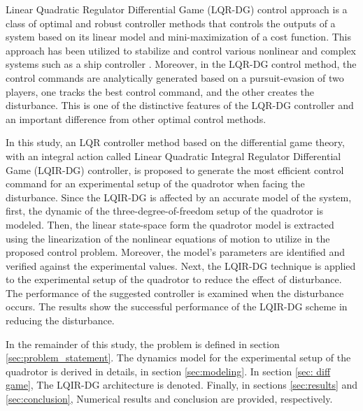 \documentclass[conference]{IEEEtran}
\begin{document}
     Linear Quadratic Regulator Differential Game (LQR-DG) control approach \cite{LQDG, robust_LQDG} is a class of optimal and robust controller methods that controls the outputs of a system based on its linear model and mini-maximization of a cost function. This approach has been utilized to stabilize and control various nonlinear and complex systems such as a ship controller \cite{LQDG_ship}. Moreover, in the LQR-DG control method, the control commands are analytically generated based on a pursuit-evasion of two players, one tracks the best control command, and the other creates the disturbance. This is one of the distinctive features of the LQR-DG controller and an important difference from other optimal control methods.


     In this study, an LQR controller method based on the differential game theory, with an integral action called Linear Quadratic Integral Regulator Differential Game (LQIR-DG) controller, is proposed to generate the most efficient control command for an experimental setup of the quadrotor when facing the disturbance. Since the LQIR-DG is affected by an accurate model of the system, first, the dynamic of the three-degree-of-freedom setup of the quadrotor is modeled. Then, the linear state-space form the quadrotor model is extracted using the linearization of the nonlinear equations of motion to utilize in the proposed control problem. Moreover, the model's parameters are identified and verified against the experimental values. Next, the LQIR-DG technique is applied to the experimental setup of the quadrotor to reduce the effect of disturbance. The performance of the suggested controller is examined when the disturbance occurs. The results show the successful performance of the LQIR-DG scheme in reducing the disturbance.


In the remainder of this study, the problem
 is defined in section \ref{sec:problem_statement}. The dynamics model for the experimental setup of the quadrotor is derived in details,  in section \ref{sec:modeling}. In section \ref{sec: diff game}, The LQIR-DG architecture is denoted. Finally, in sections \ref{sec:results} and \ref{sec:conclusion}, Numerical results and conclusion are provided, respectively.
\end{document}
